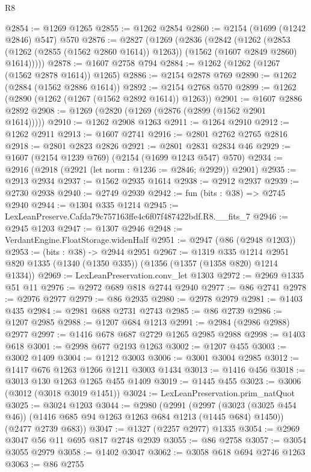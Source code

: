 \begin{lexlean}{R8}
\begin{coremodule}
@2854 := @1269 @1265
@2855 := @1262 @2854
@2860 := @2154 (@1699 (@1242 @2846) @547) @570
@2876 := @2827
    (@1269
      (@2836
        (@2842
          (@1262
            (@2853 (@1262 (@2855 (@1562 @2860 @1614)) @1263))
            (@1562 (@1607 @2849 @2860) @1614)))))
@2878 := @1607 @2758 @794
@2884 := @1262 (@1262 (@1267 (@1562 @2878 @1614)) @1265)
@2886 := @2154 @2878 @769
@2890 := @1262 (@2884 (@1562 @2886 @1614))
@2892 := @2154 @2768 @570
@2899 := @1262 (@2890 (@1262 (@1267 (@1562 @2892 @1614)) @1263))
@2901 := @1607 @2886 @2892
@2908 := @1269 (@2820 (@1269 (@2876 (@2899 (@1562 @2901 @1614)))))
@2910 := @1262 @2908 @1263
@2911 := @1264 @2910
@2912 := @1262 @2911
@2913 := @1607 @2741
@2916 := @2801 @2762 @2765 @2816
@2918 := @2801 @2823 @2826
@2921 := @2801 @2831 @2834 @46
@2929 := @1607 (@2154 @1239 @769) (@2154 (@1699 @1243 @547) @570)
@2934 := @2916 (@2918 (@2921 (let norm : @1236 := @2846; @2929)) @2901)
@2935 := @2913 @2934
@2937 := @1562 @2935 @1614
@2938 := @2912 @2937
@2939 := @2730 @2938
@2940 := @2749 @2939
@2942 := fun (bits : @38) => @2745 @2940
@2944 := @1304 @335 @1214
@2945 := LexLeanPreserve.Cafda79c757163ffe4c6f07f487422bdf.R8.__fits_7
@2946 := @2945 @1203
@2947 := @1307 @2946
@2948 := VerdantEngine.FloatStorage.widenHalf
@2951 := @2947 (@86 (@2948 @1203))
@2953 := (bits : @38) -> @2944 @2951
@2967 := @1319
    @335
    @1214
    @2951
    @820
    @1335
    (@1340 (@1350 @335))
    (@1356 (@1357 (@1358 @820) @1214 @1334))
@2969 := LexLeanPreservation.conv_let @1303
@2972 := @2969 @1335 @51 @11
@2976 := @2972 @689 @818 @2744 @2940
@2977 := @86 @2741
@2978 := @2976 @2977
@2979 := @86 @2935
@2980 := @2978 @2979
@2981 := @1403 @435
@2984 := @2981 @688 @2731 @2743
@2985 := @86 @2739
@2986 := @1207 @2985
@2988 := @1207 @684 @1213
@2991 := @2984 (@2986 @2988) @2977
@2997 := @1416 @678 @687 @2729 @1265 @2985 @2988
@2998 := @1403 @618
@3001 := @2998 @677 @2193 @1263
@3002 := @1207 @455
@3003 := @3002 @1409
@3004 := @1212 @3003
@3006 := @3001 @3004 @2985
@3012 := @1417 @676 @1263 @1266 @1211 @3003 @1434
@3013 := @1416 @456
@3018 := @3013 @130 @1263 @1265 @455 @1409
@3019 := @1445 @455
@3023 := @3006 (@3012 (@3018 @3019 @1451))
@3024 := LexLeanPreservation.prim_natQuot
@3025 := @3024 @1203
@3044 := @2980
    (@2991
      (@2997 (@3023 (@3025 @454 @46)) (@1416 @685 @94 @1263 @1263 @684 @1213 (@1445 @684) @1450))
      (@2477 @2739 @683))
@3047 := @1327 (@2257 @2977) @1335
@3054 := @2969 @3047 @56 @11 @695 @817 @2748 @2939
@3055 := @86 @2758
@3057 := @3054 @3055 @2979
@3058 := @1402 @3047
@3062 := @3058 @618 @694 @2746 @1263
@3063 := @86 @2755

\end{coremodule}
\end{lexlean}
